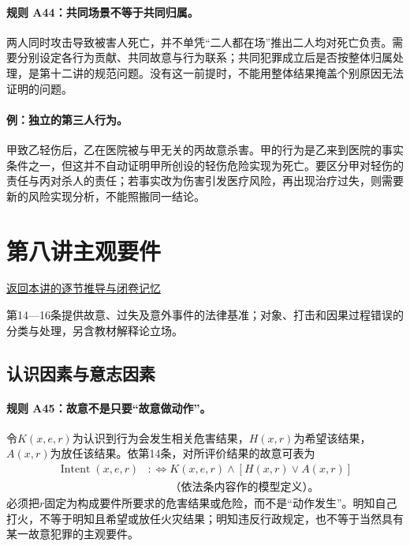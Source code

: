 \paragraph{规则 A44：共同场景不等于共同归属。}
两人同时攻击导致被害人死亡，并不单凭“二人都在场”推出二人均对死亡负责。需要分别设定各行为贡献、共同故意与行为联系；共同犯罪成立后是否按整体归属处理，是第十二讲的规范问题。没有这一前提时，不能用整体结果掩盖个别原因无法证明的问题。

\paragraph{例：独立的第三人行为。}
甲致乙轻伤后，乙在医院被与甲无关的丙故意杀害。甲的行为是乙来到医院的事实条件之一，但这并不自动证明甲所创设的轻伤危险实现为死亡。要区分甲对轻伤的责任与丙对杀人的责任；若事实改为伤害引发医疗风险，再出现治疗过失，则需要新的风险实现分析，不能照搬同一结论。

\section{第八讲\quad 主观要件}

\label{ref:lecture:08}

\noindent\hyperref[lecture:08]{返回本讲的逐节推导与闭卷记忆}

第14—16条提供故意、过失及意外事件的法律基准；对象、打击和因果过程错误的分类与处理，另含教材解释论立场。

\subsection{认识因素与意志因素}
\paragraph{规则 A45：故意不是只要“故意做动作”。}
令$K(x,e,r)$为认识到行为会发生相关危害结果，$H(x,r)$为希望该结果，$A(x,r)$为放任该结果。依第14条，对所评价结果的故意可表为
\[
\begin{aligned}
\operatorname{Intent}(x,e,r)
&:\!\iff K(x,e,r)\land[H(x,r)\lor A(x,r)]\\
&\qquad\text{（依法条内容作的模型定义）。}
\end{aligned}
\]
必须把$r$固定为构成要件所要求的危害结果或危险，而不是“动作发生”。明知自己打火，不等于明知且希望或放任火灾结果；明知违反行政规定，也不等于当然具有某一故意犯罪的主观要件。

